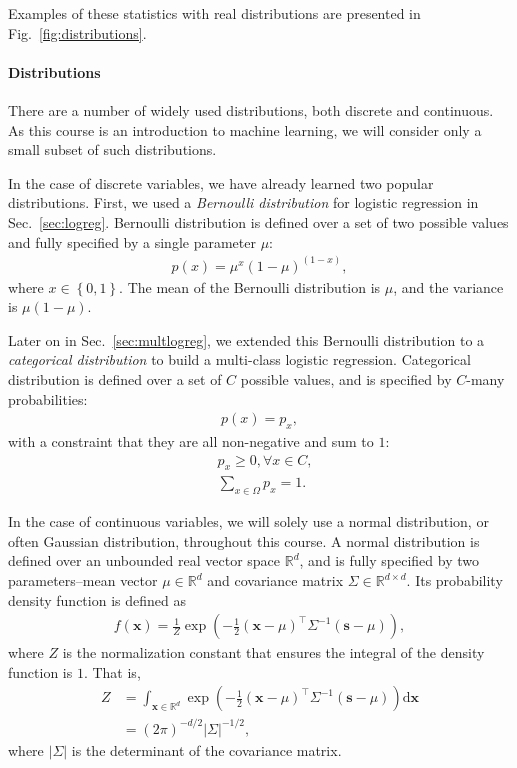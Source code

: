\documentclass{report}
\newcommand{\vect}[1]{\mathbf{#1}}
\newcommand{\vx}[0]{\vect{x}}
\newcommand{\vs}[0]{\vect{s}}
\newcommand{\RR}[0]{\mathbb{R}}
\newcommand{\dd}[1]{\ensuremath{\mbox{d}#1}}
\begin{document}
Examples of these statistics with real distributions are presented in
Fig.~\ref{fig:distributions}. 


\paragraph{Distributions}

There are a number of widely used distributions, both discrete and continuous.
As this course is an introduction to machine learning, we will consider only a
small subset of such distributions. 

In the case of discrete variables, we have already learned two popular
distributions. First, we used a {\it Bernoulli distribution} for logistic
regression in Sec.~\ref{sec:logreg}. Bernoulli distribution is defined over a
set of two possible values and fully specified by a single parameter $\mu$:
\begin{align*}
    p(x) = \mu^x (1-\mu)^(1-x),
\end{align*}
where $x \in \left\{ 0, 1\right\}$. The mean of the Bernoulli distribution is
$\mu$, and the variance is $\mu (1-\mu)$. 

Later on in Sec.~\ref{sec:multlogreg}, we extended this Bernoulli distribution
to a {\it categorical distribution} to build a multi-class logistic regression.
Categorical distribution is defined over a set of $C$ possible values, and is
specified by $C$-many probabilities:
\begin{align*}
    p(x) = p_x,
\end{align*}
with a constraint that they are all non-negative and sum to $1$:
\begin{align*}
    &p_x \geq 0, \forall x \in C, \\
    &\sum_{x \in \Omega} p_x = 1.
\end{align*}

In the case of continuous variables, we will solely use a normal distribution,
or often Gaussian distribution, throughout this course. A normal distribution is
defined over an unbounded real vector space $\RR^d$, and is fully specified by
two parameters--mean vector $\mu \in \RR^d$ and covariance matrix $\Sigma \in
\RR^{d\times d}$. Its probability density function is defined as
\begin{align}
    \label{eq:gauss_pdf}
    f(\vx) = \frac{1}{Z} \exp\left( 
        -\frac{1}{2} (\vx - \mu)^\top \Sigma^{-1} (\vs - \mu)
    \right),
\end{align}
where $Z$ is the normalization constant that ensures the integral of the density
function is $1$. That is,
\begin{align*}
    Z &= \int_{\vx \in \RR^d} \exp\left( 
        -\frac{1}{2} (\vx - \mu)^\top \Sigma^{-1} (\vs - \mu)
    \right) \dd \vx \\
    &= (2\pi)^{-d/2} |\Sigma|^{-1/2},
\end{align*}
where $|\Sigma|$ is the determinant of the covariance matrix.
\end{document}
